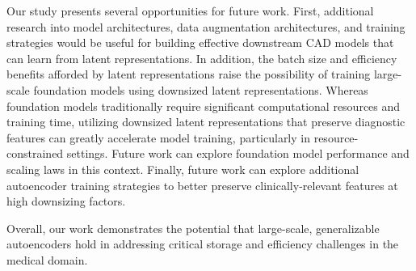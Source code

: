 Our study presents several opportunities for future work. First, additional research into model architectures, data augmentation architectures, and training strategies would be useful for building effective downstream CAD models that can learn from latent representations. In addition, the batch size and efficiency benefits afforded by latent representations raise the possibility of training large-scale foundation models using downsized latent representations. Whereas foundation models traditionally require significant computational resources and training time, utilizing downsized latent representations that preserve diagnostic features can greatly accelerate model training, particularly in resource-constrained settings. Future work can explore foundation model performance and scaling laws in this context. Finally, future work can explore additional autoencoder training strategies to better preserve clinically-relevant features at high downsizing factors. 

Overall, our work demonstrates the potential that large-scale, generalizable autoencoders hold in addressing critical storage and efficiency challenges in the medical domain. 
